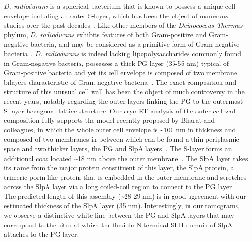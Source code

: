 \textit{D. radiodurans} is a spherical bacterium that is known to possess a unique cell envelope including an outer S-layer, which has been the object of numerous studies over the past decades~\cite{vonkugelgenMultidomainConnectorLinks2022,workMorphologyChemistryCell1968,rothfussInvolvementSlayerProteins2006,vonkugelgenInterdigitatedImmunoglobulinArrays2023,farciSDBCActiveQuenching2023,farciStructuredOrganizationDeinococcus2022,farciCryoEMStructureSlayer2022,farciStructuralAnalysisArchitecture2021,baumeisterThreedimensionalStructureRegular1986,baumeisterStructureCellEnvelope1981}.
Like other members of the \textit{Deinococcus-Thermus} phylum, \textit{D. radiodurans} exhibits features of both Gram-positive and Gram-negative bacteria, and may be considered as a primitive form of Gram-negative bacteria~\cite{ericksonHowBacterialCell2017}.
\textit{D. radiodurans} is indeed lacking lipopolysaccharides commonly found in Gram-negative bacteria, possesses a thick PG layer (35-55 nm) typical of Gram-positive bacteria and yet its cell envelope is composed of two membrane bilayers characteristic of Gram-negative bacteria~\cite{guptaOriginDidermGramnegative2011}.
The exact composition and structure of this unusual cell wall has been the object of much controversy in the recent years, notably regarding the outer layers linking the PG to the outermost S-layer hexagonal lattice structure.
Our cryo-ET analysis of the outer cell wall composition fully supports the model recently proposed by Bharat and colleagues, in which the whole outer cell envelope is \sim100 nm in thickness and composed of two membranes in between which can be found a thin periplasmic space and two thicker layers, the PG and SlpA layers~\cite{vonkugelgenMultidomainConnectorLinks2022}.
The S-layer forms an additional coat located \sim18 nm above the outer membrane~\cite{vonkugelgenInterdigitatedImmunoglobulinArrays2023}.
The SlpA layer takes its name from the major protein constituent of this layer, the SlpA protein, a trimeric porin-like protein that is embedded in the outer membrane and stretches across the SlpA layer via a long coiled-coil region to connect to the PG layer~\cite{vonkugelgenMultidomainConnectorLinks2022}.
The predicted length of this assembly (\sim28-29 nm) is in good agreement with our estimated thickness of the SlpA layer (35 nm).
Interestingly, in our tomograms, we observe a distinctive white line between the PG and SlpA layers that may correspond to the sites at which the flexible N-terminal SLH domain of SlpA attaches to the PG layer.

